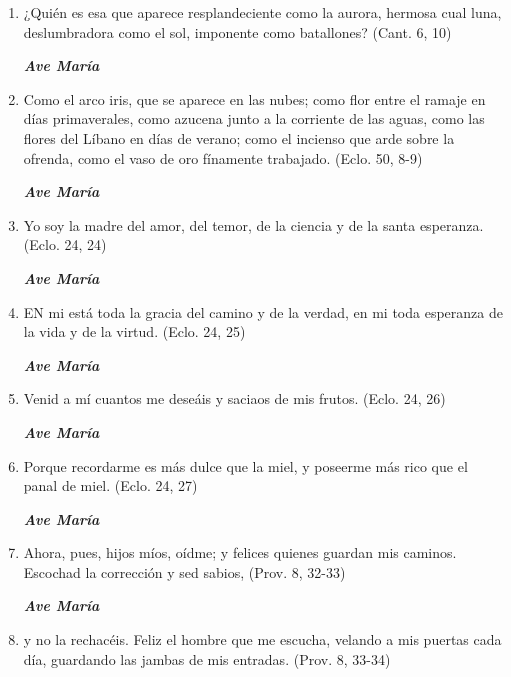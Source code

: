 \documentclass[a4paper,11pt, oneside]{report}
\begin{document}
      \begin{enumerate}

        \item ¿Quién es esa que aparece resplandeciente como la aurora,
        hermosa cual luna, deslumbradora como el sol, imponente como batallones? (Cant. 6, 10)

        \textbf{\textit{Ave María}}

        \item Como el arco iris, que se aparece en las nubes; como flor entre el ramaje en días primaverales, como azucena junto
        a la corriente de las aguas, como las flores del Líbano en días de verano; como el incienso que arde sobre la ofrenda,
        como el vaso de oro fínamente trabajado. (Eclo. 50, 8-9)

        \textbf{\textit{Ave María}}

        \item Yo soy la madre del amor, del temor, de la ciencia y de la santa esperanza. (Eclo. 24, 24)

        \textbf{\textit{Ave María}}

        \item EN mi está toda la gracia del camino y de la verdad, en mi toda esperanza de la vida y de la virtud. (Eclo. 24, 25)

        \textbf{\textit{Ave María}}

        \item Venid a mí cuantos me deseáis y saciaos de mis frutos. (Eclo. 24, 26)

        \textbf{\textit{Ave María}}

        \item Porque recordarme es más dulce que la miel, y poseerme más rico que el panal de miel. (Eclo. 24, 27)

        \textbf{\textit{Ave María}}

        \item Ahora, pues, hijos míos, oídme; y felices quienes guardan mis caminos. Escochad la corrección y sed sabios, (Prov. 8, 32-33)

        \textbf{\textit{Ave María}}

        \item y no la rechacéis. Feliz el hombre que me escucha, velando a mis puertas cada día,
        guardando las jambas de mis entradas. (Prov. 8, 33-34)


\end{enumerate}
\end{document}
